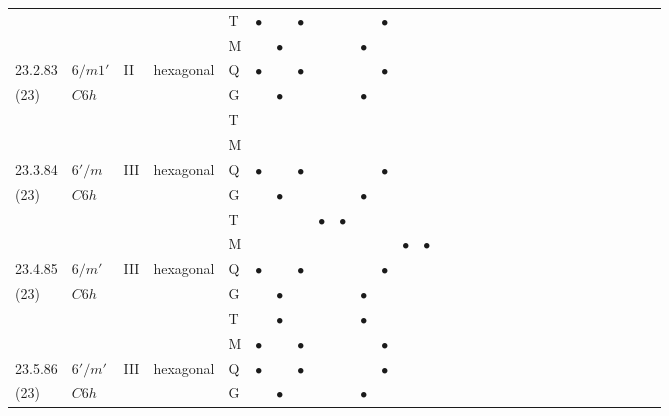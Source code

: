 \documentclass[fleqn,9pt,landscape]{jsarticle}
\begin{document}
\begin{longtable}{lllll|l|l|l|l|l|l|l|l|l|ll|ll|ll|ll|ll|ll|ll|ll}
 &  &  &  & T & $\bullet$ &  & $\bullet$ &  &  &  & $\bullet$ &  &  &  &  &  &  &  &  &  &  &  &  &  &  &  &  &  &  \\
 &  &  &  & M &  & $\bullet$ &  &  &  & $\bullet$ &  &  &  &  &  &  &  &  &  &  &  &  &  &  &  &  &  &  &  \\ \hline
23.2.83 & \texttt{$6/m1'$} & II & hexagonal & Q & $\bullet$ &  & $\bullet$ &  &  &  & $\bullet$ &  &  &  &  &  &  &  &  &  &  &  &  &  &  &  &  &  &  \\
(23) & $C6h$ &  &  & G &  & $\bullet$ &  &  &  & $\bullet$ &  &  &  &  &  &  &  &  &  &  &  &  &  &  &  &  &  &  &  \\
 &  &  &  & T &  &  &  &  &  &  &  &  &  &  &  &  &  &  &  &  &  &  &  &  &  &  &  &  &  \\
 &  &  &  & M &  &  &  &  &  &  &  &  &  &  &  &  &  &  &  &  &  &  &  &  &  &  &  &  &  \\ \hline
23.3.84 & \texttt{$6'/m$} & III & hexagonal & Q & $\bullet$ &  & $\bullet$ &  &  &  & $\bullet$ &  &  &  &  &  &  &  &  &  &  &  &  &  &  &  &  &  &  \\
(23) & $C6h$ &  &  & G &  & $\bullet$ &  &  &  & $\bullet$ &  &  &  &  &  &  &  &  &  &  &  &  &  &  &  &  &  &  &  \\
 &  &  &  & T &  &  &  & $\bullet$ & $\bullet$ &  &  &  &  &  &  &  &  &  &  &  &  &  &  &  &  &  &  &  &  \\
 &  &  &  & M &  &  &  &  &  &  &  & $\bullet$ & $\bullet$ &  &  &  &  &  &  &  &  &  &  &  &  &  &  &  &  \\ \hline
23.4.85 & \texttt{$6/m'$} & III & hexagonal & Q & $\bullet$ &  & $\bullet$ &  &  &  & $\bullet$ &  &  &  &  &  &  &  &  &  &  &  &  &  &  &  &  &  &  \\
(23) & $C6h$ &  &  & G &  & $\bullet$ &  &  &  & $\bullet$ &  &  &  &  &  &  &  &  &  &  &  &  &  &  &  &  &  &  &  \\
 &  &  &  & T &  & $\bullet$ &  &  &  & $\bullet$ &  &  &  &  &  &  &  &  &  &  &  &  &  &  &  &  &  &  &  \\
 &  &  &  & M & $\bullet$ &  & $\bullet$ &  &  &  & $\bullet$ &  &  &  &  &  &  &  &  &  &  &  &  &  &  &  &  &  &  \\ \hline
23.5.86 & \texttt{$6'/m'$} & III & hexagonal & Q & $\bullet$ &  & $\bullet$ &  &  &  & $\bullet$ &  &  &  &  &  &  &  &  &  &  &  &  &  &  &  &  &  &  \\
(23) & $C6h$ &  &  & G &  & $\bullet$ &  &  &  & $\bullet$ &  &  &  &  &  &  &  &  &  &  &  &  &  &  &  &  &  &  &  \\

\end{longtable}
\end{document}
